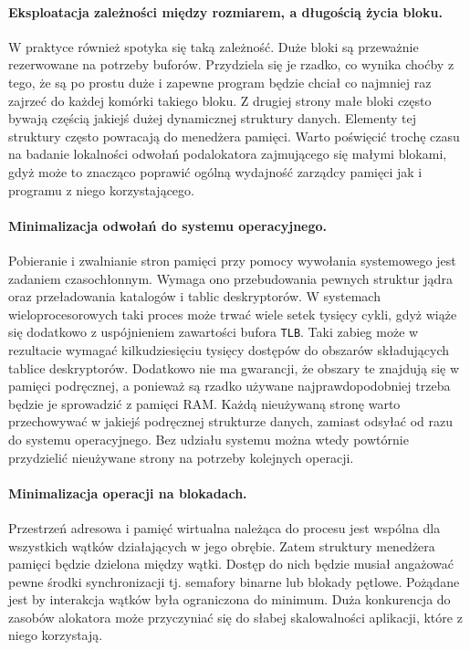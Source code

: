 \documentclass[12pt,a4paper,titlepage,twoside]{mwart}
\begin{document}
\paragraph{Eksploatacja zależności między rozmiarem, a długością życia bloku.}
W praktyce również spotyka się taką zależność. Duże bloki są przeważnie
rezerwowane na potrzeby buforów. Przydziela się je rzadko, co wynika choćby z
tego, że są po prostu duże i zapewne program będzie chciał co najmniej raz
zajrzeć do każdej komórki takiego bloku. Z drugiej strony małe bloki często
bywają częścią jakiejś dużej dynamicznej struktury danych. Elementy tej
struktury często powracają do menedżera pamięci. Warto poświęcić trochę czasu
na badanie lokalności odwołań podalokatora zajmującego się małymi blokami, gdyż
może to znacząco poprawić ogólną wydajność zarządcy pamięci jak i programu z
niego korzystającego.

\paragraph{Minimalizacja odwołań do systemu operacyjnego.} Pobieranie i
zwalnianie stron pamięci przy pomocy wywołania systemowego jest zadaniem
czasochłonnym. Wymaga ono przebudowania pewnych struktur jądra oraz
przeładowania katalogów i tablic deskryptorów. W systemach wieloprocesorowych
taki proces może trwać wiele setek tysięcy cykli, gdyż wiąże się dodatkowo z
uspójnieniem zawartości bufora \texttt{TLB}. Taki zabieg może w rezultacie
wymagać kilkudziesięciu tysięcy dostępów do obszarów składujących tablice
deskryptorów. Dodatkowo nie ma gwarancji, że obszary te znajdują się w pamięci
podręcznej, a ponieważ są rzadko używane najprawdopodobniej trzeba będzie je
sprowadzić z pamięci RAM. Każdą nieużywaną stronę warto przechowywać w jakiejś
podręcznej strukturze danych, zamiast odsyłać od razu do systemu operacyjnego.
Bez udziału systemu można wtedy powtórnie przydzielić nieużywane strony na
potrzeby kolejnych operacji.

\paragraph{Minimalizacja operacji na blokadach.} Przestrzeń adresowa i pamięć
wirtualna należąca do procesu jest wspólna dla wszystkich wątków działających w
jego obrębie. Zatem struktury menedżera pamięci będzie dzielona między wątki.
Dostęp do nich będzie musiał angażować pewne środki synchronizacji tj. semafory
binarne lub blokady pętlowe. Pożądane jest by interakcja wątków była
ograniczona do minimum. Duża konkurencja do zasobów alokatora może przyczyniać
się do słabej skalowalności aplikacji, które z niego korzystają.
\end{document}
